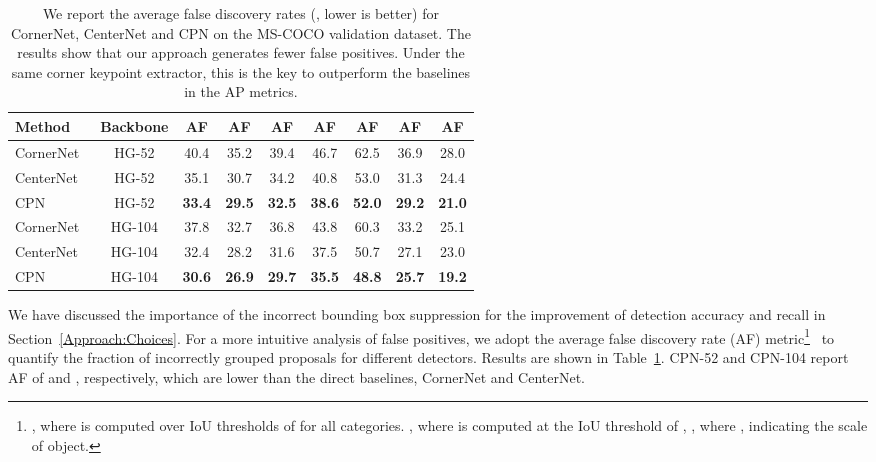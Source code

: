 \documentclass[runningheads]{llncs}
\begin{document}
\begin{table}[!t]
\small
\centering
\vspace{-1ex}
\caption{We report the average false discovery rates (, lower is better) for CornerNet, CenterNet and CPN on the MS-COCO validation dataset. The results show that our approach generates fewer false positives. Under the same corner keypoint extractor, this is the key to outperform the baselines in the AP metrics.}
\label{tab:AF}
\renewcommand\tabcolsep{0.08cm} 
\begin{tabular}{|l|c|cccc|ccc|}
\hline
Method & Backbone & AF & AF & AF & AF & AF & AF & AF\\
\hline
\hline
CornerNet~\cite{law2018cornernet} & HG-52 & 40.4 & 35.2 & 39.4 & 46.7 & 62.5 & 36.9 & 28.0\\
CenterNet~\cite{duan2019centernet} & HG-52 & 35.1 & 30.7 & 34.2 & 40.8 & 53.0 & 31.3 & 24.4\\
CPN                        & HG-52 & \textbf{33.4} & \textbf{29.5} & \textbf{32.5} & \textbf{38.6} & 
                                     \textbf{52.0} & \textbf{29.2} & \textbf{21.0}\\
\hline
CornerNet~\cite{law2018cornernet} & HG-104 & 37.8 & 32.7 & 36.8 & 43.8 & 60.3 & 33.2 & 25.1\\
CenterNet~\cite{duan2019centernet} & HG-104& 32.4 & 28.2 & 31.6 & 37.5 & 50.7 & 27.1 & 23.0\\
CPN                        & HG-104 & \textbf{30.6} & \textbf{26.9} & \textbf{29.7} & \textbf{35.5} & 
                                      \textbf{48.8} & \textbf{25.7} & \textbf{19.2}\\
\hline
\end{tabular}
\vspace{-1ex}
\end{table}

We have discussed the importance of the incorrect bounding box suppression for the improvement of detection accuracy and recall in Section~\ref{Approach:Choices}. For a more intuitive analysis of false positives, we adopt the average false discovery rate (AF) metric\footnote{, where  is computed over IoU thresholds of  for all categories. , where  is computed at the IoU threshold of , , where , indicating the scale of object.}~\cite{duan2019centernet} to quantify the fraction of incorrectly grouped proposals for different detectors. Results are shown in Table~\ref{tab:AF}. CPN-52 and CPN-104 report AF of  and , respectively, which are lower than the direct baselines, CornerNet and CenterNet.
\end{document}
